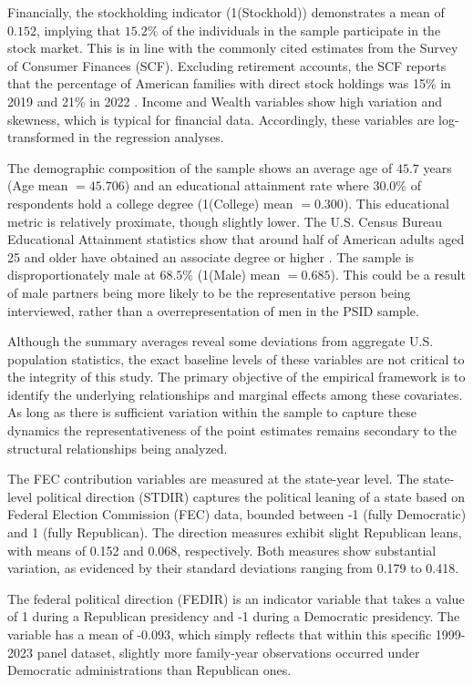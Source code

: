 Financially, the stockholding indicator (1(Stockhold)) demonstrates a mean of $0.152$, implying that $15.2\%$ of the individuals in the sample participate in the stock market. This is in line with the commonly cited estimates from the Survey of Consumer Finances (SCF). Excluding retirement accounts, the SCF reports that the percentage of American families with direct stock holdings was 15\% in 2019 and 21\% in 2022 \citep{SCF2023}. Income and Wealth variables show high variation and skewness, which is typical for financial data. Accordingly, these variables are log-transformed in the regression analyses.

The demographic composition of the sample shows an average age of $45.7$ years (Age mean $= 45.706$) and an educational attainment rate where $30.0\%$ of respondents hold a college degree (1(College) mean $= 0.300$). This educational metric is relatively proximate, though slightly lower. The U.S. Census Bureau Educational Attainment statistics show that around half of American adults aged 25 and older have obtained an associate degree or higher \citep{Census2024}. The sample is disproportionately male at $68.5\%$ (1(Male) mean $= 0.685$). This could be a result of male partners being more likely to be the representative person being interviewed, rather than a overrepresentation of men in the PSID sample.

Although the summary averages reveal some deviations from aggregate U.S. population statistics, the exact baseline levels of these variables are not critical to the integrity of this study. The primary objective of the empirical framework is to identify the underlying relationships and marginal effects among these covariates. As long as there is sufficient variation within the sample to capture these dynamics the representativeness of the point estimates remains secondary to the structural relationships being analyzed.

The FEC contribution variables are measured at the state-year level. The state-level political direction (STDIR) captures the political leaning of a state based on Federal Election Commission (FEC) data, bounded between -1 (fully Democratic) and 1 (fully Republican). The direction measures exhibit slight Republican leans, with means of 0.152 and 0.068, respectively. Both measures show substantial variation, as evidenced by their standard deviations ranging from 0.179 to 0.418.

The federal political direction (FEDIR) is an indicator variable that takes a value of 1 during a Republican presidency and -1 during a Democratic presidency. The variable has a mean of -0.093, which simply reflects that within this specific 1999-2023 panel dataset, slightly more family-year observations occurred under Democratic administrations than Republican ones.

